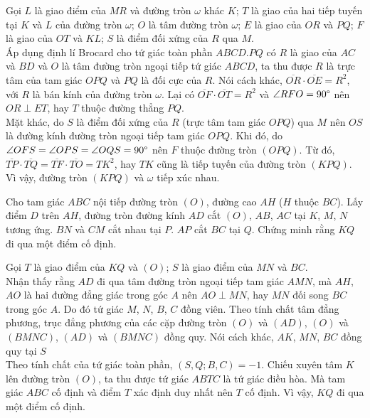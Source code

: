         \begin{solution}
            Gọi \(L\) là giao điểm của \(MR\) và đường tròn \(\omega\) khác \(K\); \(T\) là giao của hai tiếp tuyến tại \(K\) và \(L\) của đường tròn \(\omega\); \(O\) là tâm đường tròn \(\omega\); \(E\) là giao của \(OR\) và \(PQ\); \(F\) là giao của \(OT\) và \(KL\); \(S\) là điểm đối xứng của \(R\) qua \(M\).\\
            Áp dụng định lí Brocard cho tứ giác toàn phần \(ABCD.PQ\) có \(R\) là giao của \(AC\) và \(BD\) và \(O\) là tâm đường tròn ngoại tiếp tứ giác \(ABCD\), ta thu được \(R\) là trực tâm của tam giác \(OPQ\) và \(PQ\) là đối cực của \(R\). Nói cách khác, \(\overline{OR} \cdot \overline{OE} = R^2\), với \(R\) là bán kính của đường tròn \(\omega\). Lại có \(\overline{OF} \cdot \overline{OT} = R^2\) và \(\angle RFO = 90 \degree\) nên \(OR \perp ET\), hay \(T\) thuộc đường thẳng \(PQ\).\\
            Mặt khác, do \(S\) là điểm đối xứng của \(R\) (trực tâm tam giác \(OPQ\)) qua \(M\) nên \(OS\) là đường kính đường tròn ngoại tiếp tam giác \(OPQ\). Khi đó, do \(\angle OFS = \angle OPS = \angle OQS = 90 \degree\) nên \(F\) thuộc đường tròn \((OPQ)\). Từ đó, \(\overline{TP} \cdot \overline{TQ} = \overline{TF} \cdot \overline{TO} = TK^2\), hay \(TK\) cũng là tiếp tuyến của đường tròn \((KPQ)\). Vì vậy, đường tròn \((KPQ)\) và \(\omega\) tiếp xúc nhau.
        \end{solution}

        \begin{problem}
            Cho tam giác \(ABC\) nội tiếp đường tròn \((O)\), đường cao \(AH\) (\(H\) thuộc \(BC\)). Lấy điểm \(D\) trên \(AH\), đường tròn đường kính \(AD\) cắt \((O)\), \(AB\), \(AC\) tại \(K\), \(M\), \(N\) tương ứng. \(BN\) và \(CM\) cắt nhau tại \(P\). \(AP\) cắt \(BC\) tại \(Q\). Chứng minh rằng \(KQ\) đi qua một điểm cố định.
        \end{problem}

        \begin{solution}
            Gọi \(T\) là giao điểm của \(KQ\) và \((O)\); \(S\) là giao điểm của \(MN\) và \(BC\).\\
            Nhận thấy rằng \(AD\) đi qua tâm đường tròn ngoại tiếp tam giác \(AMN\), mà \(AH\), \(AO\) là hai đường đẳng giác trong góc \(A\) nên \(AO \perp MN\), hay \(MN\) đối song \(BC\) trong góc \(A\). Do đó tứ giác \(M\), \(N\), \(B\), \(C\) đồng viên. Theo tính chất tâm đẳng phương, trục đẳng phương của các cặp đường tròn \((O)\) và \((AD)\), \((O)\) và \((BMNC)\), \((AD)\) và \((BMNC)\) đồng quy. Nói cách khác, \(AK\), \(MN\), \(BC\) đồng quy tại \(S\)\\
            Theo tính chất của tứ giác toàn phần, \((S,Q;B,C) = -1\). Chiếu xuyên tâm \(K\) lên đường tròn \((O)\), ta thu được tứ giác \(ABTC\) là tứ giác điều hòa. Mà tam giác \(ABC\) cố định và điểm \(T\) xác định duy nhất nên \(T\) cố định. Vì vậy, \(KQ\) đi qua một điểm cố định.
        \end{solution}

